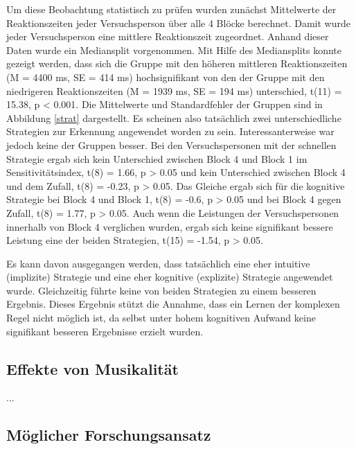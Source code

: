 \documentclass[doc,a4paper,12pt]{apa6}
\begin{document}
Um diese Beobachtung statistisch zu prüfen wurden zunächst Mittelwerte der Reaktionszeiten jeder Versuchsperson über alle 4 Blöcke berechnet. Damit wurde jeder Versuchsperson eine mittlere Reaktionszeit zugeordnet. Anhand dieser Daten wurde ein Mediansplit vorgenommen. Mit Hilfe des Mediansplits konnte gezeigt werden, dass sich die Gruppe mit den höheren mittleren Reaktionszeiten (M = 4400 ms, SE = 414 ms) hochsignifikant von den der Gruppe mit den niedrigeren Reaktionszeiten (M = 1939 ms, SE = 194 ms) unterschied, t(11) = 15.38, p < 0.001. Die Mittelwerte und Standardfehler der Gruppen sind in Abbildung \ref{strat} dargestellt. Es scheinen also tatsächlich zwei unterschiedliche Strategien zur Erkennung angewendet worden zu sein. Interessanterweise war jedoch keine der Gruppen besser. Bei den Versuchspersonen mit der schnellen Strategie ergab sich kein Unterschied zwischen Block 4 und Block 1 im Sensitivitätsindex, t(8) = 1.66, p > 0.05 und kein Unterschied zwischen Block 4 und dem Zufall, t(8) = -0.23, p > 0.05. Das Gleiche ergab sich für die kognitive Strategie bei Block 4 und Block 1, t(8) = -0.6, p > 0.05 und bei Block 4 gegen Zufall, t(8) = 1.77, p > 0.05. Auch wenn die Leistungen der Versuchspersonen innerhalb von Block 4 verglichen wurden, ergab sich keine signifikant bessere Leistung eine der beiden Strategien, t(15) = -1.54, p > 0.05.

Es kann davon ausgegangen werden, dass tatsächlich eine eher intuitive (implizite) Strategie und eine eher kognitive (explizite) Strategie angewendet wurde. Gleichzeitig führte keine von beiden Strategien zu einem besseren Ergebnis. Dieses Ergebnis stützt die Annahme, dass ein Lernen der komplexen Regel nicht möglich ist, da selbst unter hohem kognitiven Aufwand keine signifikant besseren Ergebnisse erzielt wurden.

\subsection{Effekte von Musikalität}

...


\subsection{Möglicher Forschungsansatz}
\end{document}
